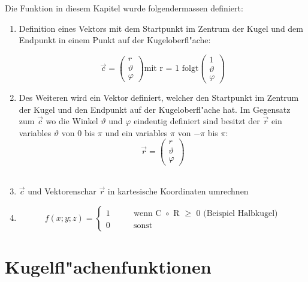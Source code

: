 \begin{refsection}
Die Funktion in diesem Kapitel wurde folgendermassen definiert:\\
\begin{enumerate}


\item Definition eines Vektors mit dem Startpunkt im Zentrum der Kugel und dem Endpunkt in einem Punkt auf der Kugeloberfl"ache:

$$
\vec{c} = 
\begin{pmatrix}
r\\
\vartheta\\
\varphi
\end{pmatrix}
\text{mit r = 1 folgt}
\begin{pmatrix}
1\\
\vartheta\\
\varphi
\end{pmatrix}
$$

\item	Des Weiteren wird ein Vektor definiert, welcher den Startpunkt im Zentrum der Kugel und den Endpunkt auf der Kugeloberfl"ache hat. Im Gegensatz zum $\vec{c}$ wo die Winkel $\vartheta$ und $\varphi$ eindeutig definiert sind besitzt der $\vec{r}$ ein variables $\vartheta$ von 0 bis $\pi$ und ein variables $\pi$ von $-\pi$ bis $\pi$: \\

$$
\vec{r} = 
\begin{pmatrix}
r\\
\vartheta\\
\varphi
\end{pmatrix} 
$$\\

\item $\vec{c}$ und  Vektorenschar $\vec{r}$ in kartesische Koordinaten umrechnen\\

\item
\[
f(x;y;z) =\begin{cases}
1& \qquad \text{wenn C $\circ$ R $\ge$ 0 (Beispiel Halbkugel)}\\
0& \qquad \text{sonst}
\end{cases}
\]


\end{enumerate}
\section{Kugelfl"achenfunktionen}



\end{refsection}
